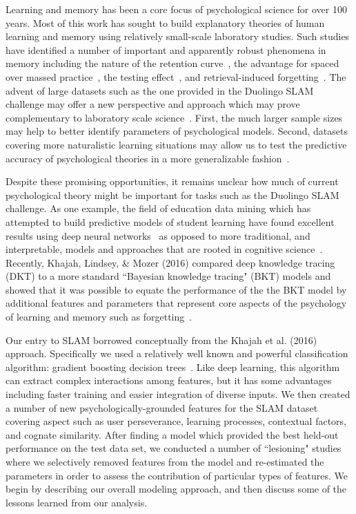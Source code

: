 \documentclass[11pt,a4paper]{article}
\begin{document}
Learning and memory has been a core focus of psychological science for
over 100 years. Most of this work has sought to build explanatory theories of human learning
and memory using relatively small-scale laboratory studies.  Such studies have
identified a number of important and apparently robust phenomena in memory including
the nature of the retention curve~\cite{Rubin:1996aa}, the advantage for spaced over massed 
practice~\cite{Ruth:1928aa,Cepeda:2006aa,Mozer:2009cs}, the testing effect~\cite{Roediger2006te},
and retrieval-induced forgetting~\cite{Anderson1994rif}.
The advent of large datasets such as the one provided in the Duolingo SLAM challenge
may offer a new perspective and approach which may prove complementary
to laboratory scale science~\cite{Griffiths:2015aa,Goldstone:2016aa}.  First, the much
larger sample sizes may help to better identify parameters of psychological models.
Second, datasets covering more naturalistic learning situations may allow us to test 
the predictive accuracy of psychological theories in a more generalizable fashion~\cite{Yarkoni:2017aa}.

Despite these promising opportunities, it remains unclear how much of current psychological
theory might be important for tasks such as the Duolingo SLAM challenge.
As one example, the field of education data mining which has attempted to build
predictive models of student learning have found excellent results using
deep neural networks~\cite[so called ``deep knowledge tracing",][]{Piech:2015aa} 
as opposed to more traditional, and interpretable, models and approaches
that are rooted in cognitive science~\cite[e.g.,][]{Atkinson:1972rm,Atkinson:1972rz,Corbett1995bkt,Pavlik:2008rm}. Recently, Khajah, Lindsey, \& Mozer (2016) compared deep knowledge tracing (DKT) to a more
standard ``Bayesian knowledge tracing" (BKT) models and showed
that it was possible to equate the performance of the the BKT model by additional 
features and parameters that represent core aspects of the psychology of learning
and memory such as forgetting~\cite{Khajah2016hdnt}.

Our entry to SLAM borrowed conceptually from the Khajah et al. (2016) approach. 
Specifically we used a relatively well known and powerful classification
algorithm: gradient boosting decision trees~\cite[GBDT][]{ke2017lightgbm}.  Like
deep learning, this algorithm can extract complex interactions among features,
but it has some advantages including faster training and easier integration of
diverse inputs. We then created a number of new psychologically-grounded features for the SLAM
dataset covering aspect such as user perseverance, learning processes, 
contextual factors, and cognate similarity.  After finding a model which provided the best
held-out performance on the test data set, we conducted a number of ``lesioning" studies where
we selectively removed features from the model and re-estimated the parameters in order
to assess the contribution of particular types of features.  We begin by describing our 
overall modeling approach, and then discuss some of the lessons learned from our analysis.
\end{document}
